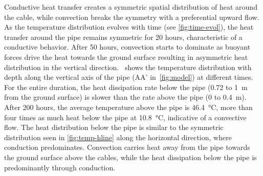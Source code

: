 \documentclass[Journal,letterpaper,InsideFigs]{ascelike-new}
\begin{document}
Conductive heat transfer creates a symmetric spatial distribution of heat around the cable, while convection breaks the symmetry with a preferential upward flow. As the temperature distribution evolves with time (see \cref{fig:time-evol}), the heat transfer around the pipe remains symmetric for 20 hours, characteristic of a conductive behavior. After 50 hours, convection starts to dominate as buoyant forces drive the heat towards the ground surface resulting in asymmetric heat distribution in the vertical direction.~ shows the temperature distribution with depth along the vertical axis of the pipe (AA’ in~\cref{fig:model}) at different times. For the entire duration, the heat dissipation rate below the pipe (0.72 to \SI{1}{\meter} from the ground surface) is slower than the rate above the pipe (0 to \SI{0.4}{\meter}). After 200 hours, the average temperature above the pipe is \SI{46.4}{\celsius}, more than four times as much heat below the pipe at \SI{10.8}{\celsius}, indicative of a convective flow. The heat distribution below the pipe is similar to the symmetric distribution seen in \cref{fig:temp-hline} along the horizontal direction, where conduction predominates. Convection carries heat away from the pipe towards the ground surface above the cables, while the heat dissipation below the pipe is predominantly through conduction. 
\end{document}
